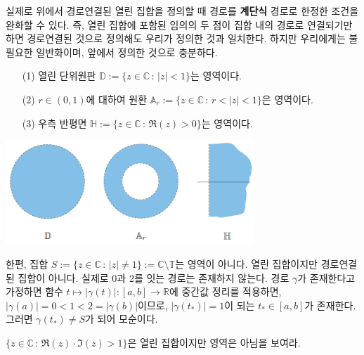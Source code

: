 실제로 위에서 경로연결된 열린 집합을 정의할 때 경로를 {\bf 계단식} 경로로 한정한 조건을 
완화할 수 있다. 즉, 열린 집합에 포함된 임의의 두 점이 집합 내의 경로로 연결되기만 하면
경로연결된 것으로 정의해도
우리가 정의한 것과 일치한다.
하지만 우리에게는 불필요한 일반화이며, 앞에서 정의한 것으로 충분하다.

\begin{saltexample}[label=example-1-3]{}{}

\begin{itemize}
\item[(1)] 열린 단위원판 $\mathbb D := \{ z\in\mathbb C\,:\, |z|<1 \}$는 영역이다.
\item[(2)] $r\in (0,1)$에 대하여 원환 $\mathbb A_r := \{ z\in\mathbb C\,:\, r<|z|<1\}$은 영역이다.
\item[(3)] 우측 반평면 $\mathbb H := \{ z\in \mathbb C \,:\, \Re(z)>0\}$는 영역이다.
\end{itemize}

\begin{center}
\includegraphics[width=0.7\textwidth]{./SaltChapter/figs/fig-1-12}
\end{center}
\label{fig-1-12}
\end{saltexample}

한편, 집합 $S:=\{z\in\mathbb C \,:\, |z|\ne 1\} := \mathbb C\setminus \mathbb T$는 
영역이 아니다. 열린 집합이지만 경로연결된 집합이 아니다.
실제로 $0$과 $2$를 잇는 경로는 존재하지 않는다.
경로 $\gamma$가 존재한다고 가정하면
함수 $t\mapsto |\gamma(t)| : [a,b] \to \mathbb R$에
중간값 정리를 적용하면,
$|\gamma(a)| = 0 < 1<2 = |\gamma(b)|$이므로,
$|\gamma(t_*)|=1$이 되는 $t_*\in [a,b]$가 존재한다.
그러면 $\gamma(t_*)\ne S$가 되어 모순이다.

\begin{salt_exercise} \label{ex-1-29}
$\{z\in \mathbb C \,:\, \Re(z) \cdot \Im(z) >1\}$은 열린 집합이지만
영역은 아님을 보여라.
\end{salt_exercise}

